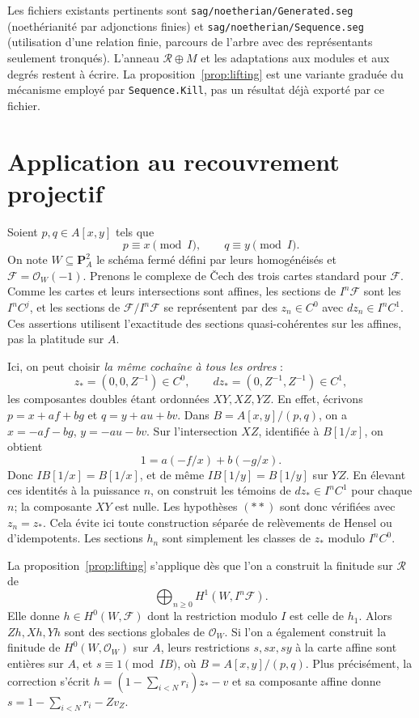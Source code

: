 \documentclass[11pt]{amsart}
\theoremstyle{remark}
\newcommand{\Rees}{\mathcal R}
\newcommand{\F}{\mathcal F}
\begin{document}
Les fichiers existants pertinents sont
\texttt{sag/noetherian/Generated.seg} (noethérianité par adjonctions
finies) et \texttt{sag/noetherian/Sequence.seg} (utilisation d'une
relation finie, parcours de l'arbre avec des représentants seulement
tronqués). L'anneau $\Rees\oplus M$ et les adaptations aux modules
et aux degrés restent à écrire. La proposition~\ref{prop:lifting}
est une variante graduée du mécanisme employé par \texttt{Sequence.Kill},
pas un résultat déjà exporté par ce fichier.

\section{Application au recouvrement projectif}

Soient $p,q\in A[x,y]$ tels que
\[
 p\equiv x\pmod{I},\qquad q\equiv y\pmod{I}.
\]
On note $W\subseteq\mathbf P^2_A$ le schéma fermé défini par leurs
homogénéisés et $\F=\mathcal O_W(-1)$.
Prenons le complexe de Čech des trois cartes standard pour $\F$.
Comme les cartes et leurs intersections sont affines, les sections
de $I^n\F$ sont les $I^nC^j$, et les sections de $\F/I^n\F$
se représentent par des $z_n\in C^0$ avec $dz_n\in I^nC^1$.
Ces assertions utilisent l'exactitude des sections quasi-cohérentes
sur les affines, pas la platitude sur $A$.

Ici, on peut choisir \emph{la même cochaîne à tous les ordres} :
\[
 z_*=(0,0,Z^{-1})\in C^0,\qquad
 dz_*=(0,Z^{-1},Z^{-1})\in C^1,
\]
les composantes doubles étant ordonnées $XY,XZ,YZ$.
En effet, écrivons $p=x+af+bg$ et $q=y+au+bv$.
Dans $B=A[x,y]/(p,q)$, on a $x=-af-bg$, $y=-au-bv$.
Sur l'intersection $XZ$, identifiée à $B[1/x]$, on obtient
\[
 1=a(-f/x)+b(-g/x).
\]
Donc $IB[1/x]=B[1/x]$, et de même $IB[1/y]=B[1/y]$ sur $YZ$.
En élevant ces identités à la puissance $n$, on construit les témoins
de $dz_*\in I^nC^1$ pour chaque $n$; la composante $XY$ est nulle.
Les hypothèses $(**)$ sont donc vérifiées avec $z_n=z_*$.
Cela évite ici toute construction séparée de relèvements de Hensel
ou d'idempotents. Les sections $h_n$ sont simplement les classes de
$z_*$ modulo $I^nC^0$.

La proposition~\ref{prop:lifting} s'applique dès que l'on a construit
la finitude sur $\Rees$ de
\[
 \bigoplus_{n\geq0}H^1(W,I^n\F).
 \tag{F}
\]
Elle donne $h\in H^0(W,\F)$ dont la restriction modulo $I$
est celle de $h_1$. Alors $Zh,Xh,Yh$ sont des sections globales
de $\mathcal O_W$. Si l'on a également construit la finitude de
$H^0(W,\mathcal O_W)$ sur $A$, leurs restrictions $s,sx,sy$
à la carte affine sont entières sur $A$, et $s\equiv1\pmod{IB}$,
où $B=A[x,y]/(p,q)$. Plus précisément, la correction s'écrit
$h=(1-\sum_{i<N}r_i)z_*-v$ et sa composante affine donne
$s=1-\sum_{i<N}r_i-Zv_Z$.
\end{document}
